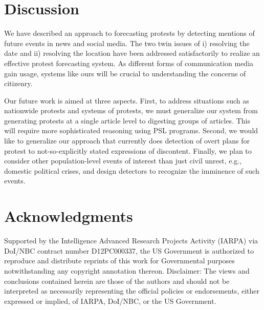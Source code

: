 \documentclass[letterpaper]{article}
\begin{document}
\vspace{-1em}
{\small
\section{Discussion}
We have described an approach to forecasting protests by detecting mentions of future events in news and social
media. The two twin issues of i) resolving the date and ii) resolving the location have been addressed satisfactorily
to realize an effective protest forecasting system. As different forms of communication media gain usage, systems
like ours will be crucial to understanding the concerns of citizenry.

Our future work is aimed at three aspects. First, to address situations such as nationwide protests and systems of protests,
we must generalize our system from generating protests at a single article level to digesting groups of articles. This will
require more sophisticated reasoning using PSL programs. 
Second, we would like to generalize our approach that currently
does detection of overt plans for protest to not-so-explicitly stated expressions of discontent. 
Finally, we plan to consider other population-level events of interest than just civil unrest, e.g., domestic political crises,
and design detectors to recognize the imminence of such events.

\vspace{-0.8em}
\section*{Acknowledgments}
Supported by the Intelligence Advanced Research Projects Activity (IARPA) via
DoI/NBC contract number D12PC000337, the US Government is authorized to reproduce and distribute reprints of
this work for Governmental purposes notwithstanding any copyright annotation thereon.
Disclaimer: The views and conclusions contained herein are those of the authors and should not be interpreted as necessarily representing the official policies or endorsements, either expressed or implied, of IARPA, DoI/NBC, or the US Government.
}\vspace{-1em}
\small


\end{document}
